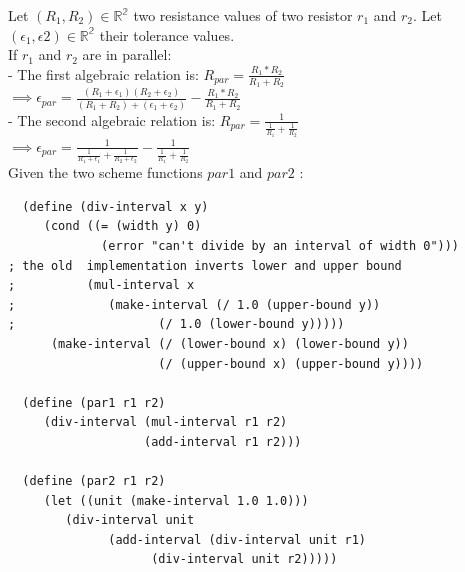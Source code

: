 \documentclass{article}
\begin{document}
\noindent Let $ (R_1,R_2) \in \mathbb{R^2} $ two resistance values of two resistor $r_1$ and $r_2$. Let $ (\epsilon_1,\epsilon2) \in \mathbb{R^2} $ their tolerance values.\\
If $r_1$ and $r_2$ are in parallel: \\
- The first algebraic relation is: $ R_{par} = \frac{R_1*R_2}{R_1 + R_2} $\\
$\implies \epsilon_{par} =  \frac{(R_1+\epsilon_1)(R_2+\epsilon_2)}{(R_1 + R_2) + (\epsilon_1 + \epsilon_2)} -  \frac{R_1*R_2}{R_1 + R_2} $\\
- The second algebraic relation is: $R_{par} = \frac{1}{\frac{1}{R_1} + \frac{1}{R_2}} $\\
$\implies \epsilon_{par} =  \frac{1}{\frac{1}{R_1+\epsilon_1} + \frac{1}{R_2+\epsilon_2}} - \frac{1}{\frac{1}{R_1} + \frac{1}{R_2}}$\\
Given the two scheme functions $par1$ and $par2$ :\\
\begin{lstlisting}
  (define (div-interval x y)
     (cond ((= (width y) 0)
             (error "can't divide by an interval of width 0")))
; the old  implementation inverts lower and upper bound
;          (mul-interval x
;	          (make-interval (/ 1.0 (upper-bound y))
;	           		 (/ 1.0 (lower-bound y)))))
      (make-interval (/ (lower-bound x) (lower-bound y))
                     (/ (upper-bound x) (upper-bound y))))
  
  (define (par1 r1 r2)
     (div-interval (mul-interval r1 r2)
                   (add-interval r1 r2)))

  (define (par2 r1 r2)
     (let ((unit (make-interval 1.0 1.0)))
        (div-interval unit
		      (add-interval (div-interval unit r1)
				    (div-interval unit r2)))))
\end{lstlisting}
\end{document}
